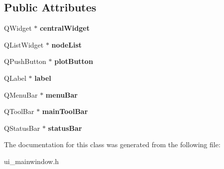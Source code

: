\subsection*{Public Attributes}
\begin{DoxyCompactItemize}
\item 
\hypertarget{classUi__MainWindow_a30075506c2116c3ed4ff25e07ae75f81}{
QWidget $\ast$ {\bfseries centralWidget}}
\label{classUi__MainWindow_a30075506c2116c3ed4ff25e07ae75f81}

\item 
\hypertarget{classUi__MainWindow_ae5b42b8a607e73fa1ec122ae266c265a}{
QListWidget $\ast$ {\bfseries nodeList}}
\label{classUi__MainWindow_ae5b42b8a607e73fa1ec122ae266c265a}

\item 
\hypertarget{classUi__MainWindow_a0bb837a3dc11b5221960ab03018351bb}{
QPushButton $\ast$ {\bfseries plotButton}}
\label{classUi__MainWindow_a0bb837a3dc11b5221960ab03018351bb}

\item 
\hypertarget{classUi__MainWindow_ad9c89133780f28e6efa2ec17ceb9cff5}{
QLabel $\ast$ {\bfseries label}}
\label{classUi__MainWindow_ad9c89133780f28e6efa2ec17ceb9cff5}

\item 
\hypertarget{classUi__MainWindow_a2be1c24ec9adfca18e1dcc951931457f}{
QMenuBar $\ast$ {\bfseries menuBar}}
\label{classUi__MainWindow_a2be1c24ec9adfca18e1dcc951931457f}

\item 
\hypertarget{classUi__MainWindow_a5172877001c8c7b4e0f6de50421867d1}{
QToolBar $\ast$ {\bfseries mainToolBar}}
\label{classUi__MainWindow_a5172877001c8c7b4e0f6de50421867d1}

\item 
\hypertarget{classUi__MainWindow_a50fa481337604bcc8bf68de18ab16ecd}{
QStatusBar $\ast$ {\bfseries statusBar}}
\label{classUi__MainWindow_a50fa481337604bcc8bf68de18ab16ecd}

\end{DoxyCompactItemize}


The documentation for this class was generated from the following file:\begin{DoxyCompactItemize}
\item 
ui\_\-mainwindow.h\end{DoxyCompactItemize}
